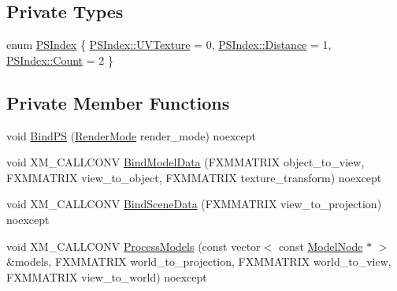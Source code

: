 \subsection*{Private Types}
\begin{DoxyCompactItemize}
\item 
enum \hyperlink{classmage_1_1_constant_component_pass_a5700234587f2aa0ebdb4f7790704f00b}{P\+S\+Index} \{ \hyperlink{classmage_1_1_constant_component_pass_a5700234587f2aa0ebdb4f7790704f00ba73dca3b76eca77b89c050588adba1c2b}{P\+S\+Index\+::\+U\+V\+Texture} = 0, 
\hyperlink{classmage_1_1_constant_component_pass_a5700234587f2aa0ebdb4f7790704f00ba0aa6f4210bf373c95eda00232e93cd98}{P\+S\+Index\+::\+Distance} = 1, 
\hyperlink{classmage_1_1_constant_component_pass_a5700234587f2aa0ebdb4f7790704f00bae93f994f01c537c4e2f7d8528c3eb5e9}{P\+S\+Index\+::\+Count} = 2
 \}
\end{DoxyCompactItemize}
\subsection*{Private Member Functions}
\begin{DoxyCompactItemize}
\item 
void \hyperlink{classmage_1_1_constant_component_pass_ac8ecc634c666b61931150e6f0b6805d5}{Bind\+PS} (\hyperlink{namespacemage_a5e7e18b0154373ce8fc942fe3f6b27fd}{Render\+Mode} render\+\_\+mode) noexcept
\item 
void X\+M\+\_\+\+C\+A\+L\+L\+C\+O\+NV \hyperlink{classmage_1_1_constant_component_pass_a91ac4ce9a2d4878d022b7e0aec7f9d06}{Bind\+Model\+Data} (F\+X\+M\+M\+A\+T\+R\+IX object\+\_\+to\+\_\+view, F\+X\+M\+M\+A\+T\+R\+IX view\+\_\+to\+\_\+object, F\+X\+M\+M\+A\+T\+R\+IX texture\+\_\+transform) noexcept
\item 
void X\+M\+\_\+\+C\+A\+L\+L\+C\+O\+NV \hyperlink{classmage_1_1_constant_component_pass_a6342dc3563ffabadfd47d818a465cf18}{Bind\+Scene\+Data} (F\+X\+M\+M\+A\+T\+R\+IX view\+\_\+to\+\_\+projection) noexcept
\item 
void X\+M\+\_\+\+C\+A\+L\+L\+C\+O\+NV \hyperlink{classmage_1_1_constant_component_pass_a1f890345d560ee2652fa4772dfe50d7a}{Process\+Models} (const vector$<$ const \hyperlink{classmage_1_1_model_node}{Model\+Node} $\ast$ $>$ \&models, F\+X\+M\+M\+A\+T\+R\+IX world\+\_\+to\+\_\+projection, F\+X\+M\+M\+A\+T\+R\+IX world\+\_\+to\+\_\+view, F\+X\+M\+M\+A\+T\+R\+IX view\+\_\+to\+\_\+world) noexcept
\end{DoxyCompactItemize}
